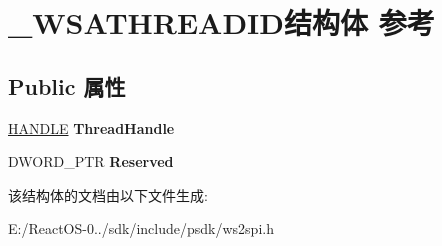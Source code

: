 \hypertarget{struct___w_s_a_t_h_r_e_a_d_i_d}{}\section{\+\_\+\+W\+S\+A\+T\+H\+R\+E\+A\+D\+I\+D结构体 参考}
\label{struct___w_s_a_t_h_r_e_a_d_i_d}
\subsection*{Public 属性}
\begin{DoxyCompactItemize}
\item 
\mbox{\label{struct___w_s_a_t_h_r_e_a_d_i_d_a0e1bcf98d13a6300a22e699168558a81}} 
\hyperlink{interfacevoid}{H\+A\+N\+D\+LE} {\bfseries Thread\+Handle}
\item 
\mbox{\label{struct___w_s_a_t_h_r_e_a_d_i_d_a4ff506177d4d6734a51df8cbdca3f2f0}} 
D\+W\+O\+R\+D\+\_\+\+P\+TR {\bfseries Reserved}
\end{DoxyCompactItemize}


该结构体的文档由以下文件生成\+:\begin{DoxyCompactItemize}
\item 
E\+:/\+React\+O\+S-\/0../sdk/include/psdk/ws2spi.\+h\end{DoxyCompactItemize}
